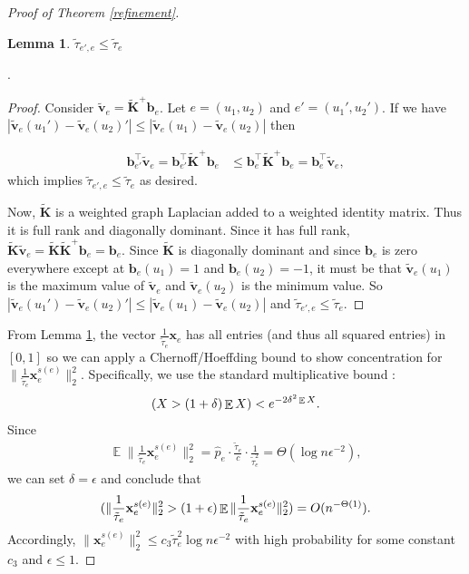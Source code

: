 \documentclass[11pt]{article}
\DeclareMathOperator*{\E}{\mathbb{E}}
\let\Pr\relax
\DeclareMathOperator*{\Pr}{\mathbb{P}}
\newcommand{\norm}[1]{\|#1\|}
\newcommand{\bv}[1]{\mathbf{#1}}
\newtheorem{lemma}{Lemma}
\begin{document}
\begin{proof}[Proof of Theorem \ref{refinement}]
\begin{lemma}\label{leverage_score_bound}$\tilde \tau_{e',e} \le \tilde \tau_e$\end{lemma}.
\begin{proof}



Consider $\bv{\tilde  v}_e = \bv{\tilde K}^+ \bv{b}_e$. 
Let $e = (u_1,u_2)$ and $e' = (u_1',u_2')$. If we have $|\bv{\tilde v}_e(u_1') - \bv{\tilde v}_e(u_2)'| \le |\bv{\tilde v}_e(u_1) - \bv{\tilde v}_e(u_2)|$ then

\begin{align*}
\bv{b}_{e'}^\top \bv{ \tilde v}_e  = \bv{b}_{e'}^\top \bv{ \tilde K}^+ \bv{b}_e &\le \bv{b}_{e}^\top \bv{ \tilde K}^+ \bv{b}_e = \bv{b}_{e}^\top \bv{ \tilde v}_e,
\end{align*}
which implies $\tilde \tau_{e',e} \le  \tilde \tau_{e}$ as desired.


Now, $\bv{\tilde K}$ is a weighted graph Laplacian added to a weighted identity matrix. Thus it is full rank and diagonally dominant. Since it has full rank, $\bv{\tilde K} \bv{\tilde v}_e = \bv{\tilde K} \bv{\tilde K}^+ \bv{b}_e = \bv{b}_e$. Since $\bv{\tilde K}$ is diagonally dominant and since $\bv{b}_e$ is zero everywhere except at $\bv{b}_e(u_1) = 1$ and $\bv{b}_e(u_2) = -1$, it must be that  $\bv{\tilde v}_e(u_1)$ is the maximum value of $\bv{\tilde v}_e$ and $\bv{\tilde v}_e(u_2)$ is the minimum value. So $|\bv{\tilde v}_e(u_1') - \bv{\tilde v}_e(u_2)'| \le |\bv{ \tilde v}_e(u_1) - \bv{\tilde v}_e(u_2)|$ and $\tilde \tau_{e',e} \le \tilde \tau_{e}$.

\end{proof}
From Lemma \ref{leverage_score_bound}, the vector $\frac{1}{\tilde \tau_e}\bv{x}_e$ has all entries (and thus all squared entries) in $[0,1]$ so we can apply a Chernoff/Hoeffding bound to show concentration for $\|\frac{1}{\tilde \tau_e}\bv{x}_e^{s(e)}\|_2^2$. Specifically, we use the standard multiplicative bound \cite{Hoeffding:1963}:
\begin{align}
\Pr(X > (1+\delta)\E{X}) < e^{- 2\delta^2\E{X}}.
\end{align}
Since
\begin{align}\label{x_e_expectation_upper}
\E \norm{\frac{1}{\tilde \tau_e}\bv{x}_e^{s(e)}}_2^2 = \hat{p}_e \cdot \frac{\tilde \tau_e}{c} \cdot \frac{1}{\tilde \tau_e^2} = \Theta(\log n \epsilon^{-2}),
\end{align}
we can set $\delta = \epsilon$ and conclude that
\begin{align*}
\Pr(\norm{\frac{1}{\tilde \tau_e}\bv{x}_e^{s(e)}}_2^2 > (1+\epsilon)\E \norm{\frac{1}{\tilde \tau_e}\bv{x}_e^{s(e)}}_2^2) = O(n^{-\Theta(1)}).
\end{align*} 
Accordingly, $\norm{\bv{x}_e^{s(e)}}_2^2 \leq c_3 \tilde \tau_e^2 \log n \epsilon^{-2}$ with high probability for some constant $c_3$ and $\epsilon \leq 1$.


\end{proof}
\end{document}
